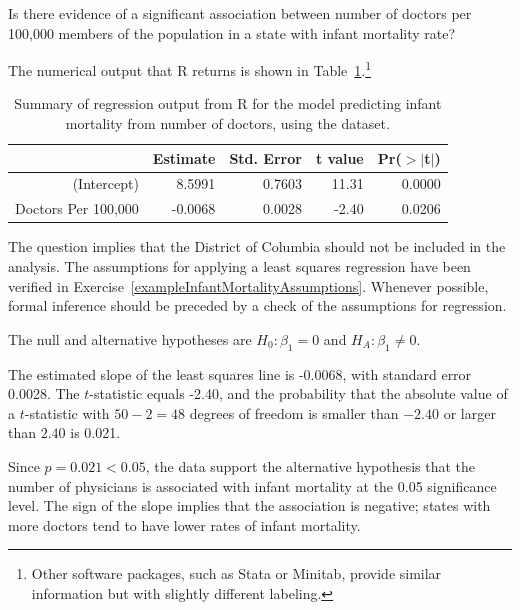 \begin{example}{Is there evidence of a significant association between number of doctors per 100,000 members of the population in a state with infant mortality rate? 
		
The numerical output that \textsf{R} returns is shown in Table~\ref{infantMortalityInferenceOutput}.\footnote{Other software packages, such as Stata or Minitab, provide similar information but with slightly different labeling.} 

\begin{table}[h!]
	\centering
	\begin{tabular}{rrrrr}
		\hline
		& Estimate & Std. Error & t value & Pr($>$$|$t$|$) \\ 
		\hline
		(Intercept) & 8.5991 & 0.7603 & 11.31 & 0.0000 \\ 
		Doctors Per 100,000 & -0.0068 & 0.0028 & -2.40 & 0.0206 \\ 
		\hline
	\end{tabular}
	\caption{Summary of regression output from \textsf{R} for the model predicting infant mortality from number of doctors, using the  dataset.}
	\label{infantMortalityInferenceOutput}
\end{table}

				
		}
	
The question implies that the District of Columbia should not be included in the analysis. The assumptions for applying a least squares regression have been verified in Exercise~\ref{exampleInfantMortalityAssumptions}. Whenever possible, formal inference should be preceded by a check of the assumptions for regression.

The null and alternative hypotheses are $H_0:\beta_1 = 0$ and $H_A:\beta_1 \neq 0.$	


The estimated slope of the least squares line is -0.0068, with standard error 0.0028. The $t$-statistic equals -2.40, and the probability that the absolute value of a $t$-statistic with $50-2=48$ degrees of freedom is smaller than $-2.40$ or larger than $2.40$ is 0.021. 

Since $p = 0.021 < 0.05$, the data support the alternative hypothesis that the number of physicians is associated with infant mortality at the 0.05 significance level. The sign of the slope implies that the association is negative; states with more doctors tend to have lower rates of infant mortality.
\label{exampleInfantMortalityInference}		
\end{example}

